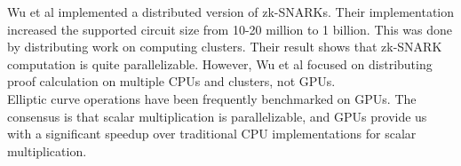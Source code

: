 Wu et al\cite{wu2018dizk} implemented a distributed version of zk-SNARKs. Their implementation increased the supported circuit size from 10-20 million to 1 billion. This was done by distributing work on computing clusters. Their result shows that zk-SNARK computation is quite parallelizable. However, Wu et al focused on distributing proof calculation on multiple CPUs and clusters, not GPUs.
\\
Elliptic curve operations have been frequently benchmarked on GPUs\cite{mahefast, bernstein2010ecc2k, antao2010elliptic}. The consensus is that scalar multiplication is parallelizable, and GPUs provide us with a significant speedup over traditional CPU implementations for scalar multiplication.